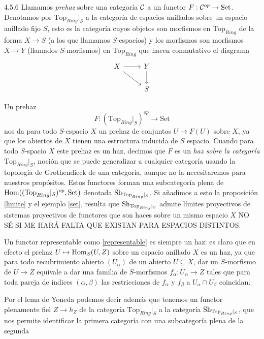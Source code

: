 \documentclass[twoside]{article}
\begin{document}
\begin{remarque}{4.5.6}
Llamamos \emph{prehaz} sobre una categoría ${\mathcal C}$ a un functor $F:{\mathcal C}^{op}\to\mathrm{Set}$. Denotamos por $\mathrm{Top}_{Ring}|_S$ a la categoría de espacios anillados sobre un espacio anillado fijo $S$, esto es la categoría cuyos objetos son morfismos en $\mathrm{Top}_{Ring}$ de la forma $X\to S$ (a los que llamamos $S$-espacios) y los morfismos son morfismos $X\to Y$ (llamados $S$-morfismos) en $\mathrm{Top}_{Ring}$ que hacen conmutativo el diagrama
\[
\begin{tikzcd}
X\arrow[r]\arrow[dr] & Y\arrow[d]\\
 & S
\end{tikzcd}
\]

Un prehaz 
\begin{equation}\label{representable}
F:(\mathrm{Top}_{Ring}|_S)^{op}\to\mathrm{Set}
\end{equation}
 nos da para todo $S$-espacio $X$ un prehaz de conjuntos $U\to F(U)$ sobre $X$, ya que los abiertos de $X$ tienen una estructura inducida de $S$ espacio. Cuando para todo $S$-spacio $X$ este prehaz es un haz, decimos que $F$ es un \emph{haz sobre la categoría} $\mathrm{Top}_{Ring}|_S$, noción que se puede generalizar a cualquier categoría usando la topología de Grothendieck de una categoría, aunque no la necesitaremos para nuestros propósitos. Estos functores forman una subcategoría plena de $\operatorname{Hom}((\mathrm{Top}_{Ring}|_S)^{op},\mathrm{Set})$ denotada $\operatorname{Sh}_{\mathrm{Top}_{Ring}|_S}$. Si añadimos a esto la proposición \ref{limite} y el ejemplo \ref{set}, resulta que $\operatorname{Sh}_{\mathrm{Top}_{Ring}|_S}$ admite límites proyectivos de sistemas proyectivos de functores que son haces sobre un mismo espacio $X$ NO SÉ SI ME HARÁ FALTA QUE EXISTAN PARA ESPACIOS DISTINTOS. %


Un functor representable como \ref{representable} es siempre un haz: es claro que en efecto el prehaz $U\mapsto\operatorname{Hom}_S(U,Z)$ sobre un espacio anillado $X$ es un haz, ya que para todo recubrimiento abierto $(U_\alpha)$ de un abierto $U\subseteq X$, dar un $S$-morfismo de $U\to Z$ equivale a dar una familia de $S$-morfismos $f_\alpha:U_\alpha\to Z$ tales que para toda pareja de índices $(\alpha,\beta)$ las restricciones de $f_\alpha$ y $f_\beta$ a $U_\alpha\cap U_\beta$ coincidan.

Por el lema de Yoneda podemos decir además que tenemos un functor plenamente fiel $Z\to h_Z$ de la categoría $\mathrm{Top}_{Ring}|_S$ a la categoría $\operatorname{Sh}_{\mathrm{Top}_{Ring}|_S}$, que nos permite identificar la primera categoría con una subcategoría plena de la segunda %


\end{remarque}
\end{document}
